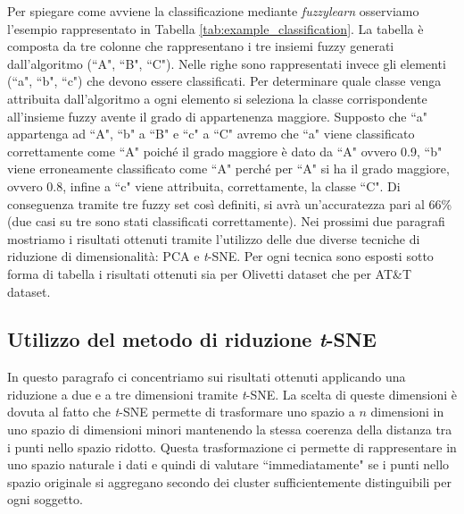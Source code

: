 \documentclass[12pt,italian]{report}
\begin{document}
Per spiegare come avviene la classificazione mediante \emph{fuzzylearn} osserviamo l'esempio rappresentato in Tabella \ref{tab:example_classification}. La tabella è composta da tre colonne che rappresentano i tre insiemi fuzzy generati dall'algoritmo (``A", ``B", ``C"). Nelle righe sono rappresentati invece gli elementi (``a", ``b", ``c") che devono essere classificati. Per determinare quale classe venga attribuita dall'algoritmo a ogni elemento si seleziona la classe corrispondente all'insieme fuzzy avente il grado di appartenenza maggiore. Supposto che ``a" appartenga ad ``A", ``b" a ``B" e ``c" a ``C" avremo che ``a" viene classificato correttamente come ``A" poiché il grado maggiore è dato da ``A" ovvero 0.9, ``b" viene erroneamente classificato come ``A" perché per ``A" si ha il grado maggiore, ovvero 0.8, infine a ``c" viene attribuita, correttamente, la classe ``C". Di conseguenza tramite tre fuzzy set così definiti, si avrà un'accuratezza pari al 66\% (due casi su tre sono stati classificati correttamente).
Nei prossimi due paragrafi mostriamo i risultati ottenuti tramite l'utilizzo delle due diverse tecniche di riduzione di dimensionalità: PCA e \emph{t}-SNE. Per ogni tecnica sono esposti sotto forma di tabella i risultati ottenuti sia per Olivetti dataset che per AT\&T dataset. 

\subsection{Utilizzo del metodo di riduzione \emph{t}-SNE}
In questo paragrafo ci concentriamo sui risultati ottenuti applicando una riduzione a due e a tre dimensioni tramite \emph{t}-SNE. La scelta di queste dimensioni è dovuta al fatto che \emph{t}-SNE permette di trasformare uno spazio a $ n $ dimensioni in uno spazio di dimensioni minori mantenendo la stessa coerenza della distanza tra i punti nello spazio ridotto. Questa trasformazione ci permette di rappresentare in uno spazio naturale i dati e quindi di valutare ``immediatamente" se i punti nello spazio originale si aggregano secondo dei cluster sufficientemente distinguibili per ogni soggetto.
\end{document}
